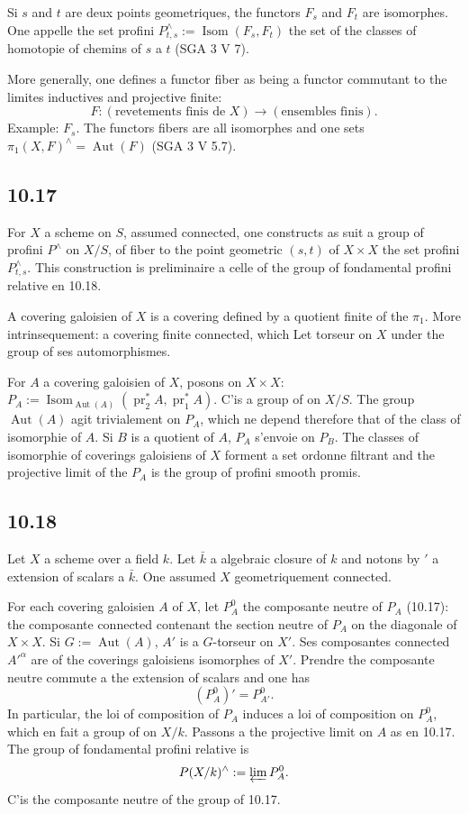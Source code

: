 \documentclass[12pt,a4paper]{article}
\theoremstyle{plain}
\theoremstyle{definition}
\theoremstyle{remark}
\DeclareMathOperator{\Isom}{Isom}
\DeclareMathOperator{\Aut}{Aut}
\DeclareMathOperator{\pr}{pr}
\begin{document}
Si $s$ and $t$ are deux points geometriques, the functors $F_s$ and $F_t$ are isomorphes. One appelle the set profini $P^\wedge_{t,s} := \Isom(F_s, F_t)$ the set of the classes of homotopie of chemins of $s$ a $t$ (SGA 3 V 7).

More generally, one defines a functor fiber as being a functor commutant to the limites inductives and projective finite:
$$F: (\text{revetements finis de } X) \longrightarrow (\text{ensembles finis}).$$
Example: $F_s$. The functors fibers are all isomorphes and one sets $\pi_1(X, F)^\wedge = \Aut(F)$ (SGA 3 V 5.7).

\subsection*{10.17}

For $X$ a scheme on $S$, assumed connected, one constructs as suit a group of profini $P^\wedge$ on $X/S$, of fiber to the point geometric $(s, t)$ of $X \times X$ the set profini $P^\wedge_{t,s}$. This construction is preliminaire a celle of the group of fondamental profini relative en 10.18.

A covering galoisien of $X$ is a covering defined by a quotient finite of the $\pi_1$. More intrinsequement: a covering finite connected, which Let torseur on $X$ under the group of ses automorphismes.

For $A$ a covering galoisien of $X$, posons on $X \times X$: $P_A := \Isom_{\Aut(A)}(\pr_2^* A, \pr_1^* A)$. C'is a group of on $X/S$. The group $\Aut(A)$ agit trivialement on $P_A$, which ne depend therefore that of the class of isomorphie of $A$. Si $B$ is a quotient of $A$, $P_A$ s'envoie on $P_B$. The classes of isomorphie of coverings galoisiens of $X$ forment a set ordonne filtrant and the projective limit of the $P_A$ is the group of profini smooth promis.

\subsection*{10.18}

Let $X$ a scheme over a field $k$. Let $\bar{k}$ a algebraic closure of $k$ and notons by $'$ a extension of scalars a $\bar{k}$. One assumed $X$ geometriquement connected.

For each covering galoisien $A$ of $X$, let $P_A^0$ the composante neutre of $P_A$ (10.17): the composante connected contenant the section neutre of $P_A$ on the diagonale of $X \times X$. Si $G := \Aut(A)$, $A'$ is a $G$-torseur on $X'$. Ses composantes connected $A'^\alpha$ are of the coverings galoisiens isomorphes of $X'$. Prendre the composante neutre commute a the extension of scalars and one has
$$(P_A^0)' = P_{A'}^0.$$
In particular, the loi of composition of $P_A$ induces a loi of composition on $P_A^0$, which en fait a group of on $X/k$. Passons a the projective limit on $A$ as en 10.17. The group of fondamental profini relative is
$$P(X/k)^\wedge := \varprojlim P_A^0.$$
C'is the composante neutre of the group of 10.17.
\end{document}
